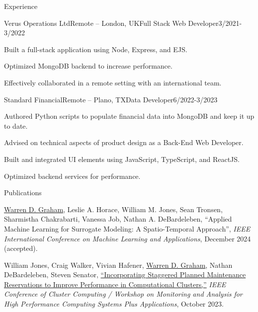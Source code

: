 \documentclass{resume} %
\begin{document}
\begin{rSection}{Experience}
\begin{rSubsection}{Verus Operations Ltd}{Remote – London, UK}{Full Stack Web Developer}{3/2021-3/2022}
  \item Built a full-stack application using Node, Express, and EJS.
  \item Optimized MongoDB backend to increase performance.
  \item Effectively collaborated in a remote setting with an international team.
\end{rSubsection}

\begin{rSubsection}{Standard Financial}{Remote – Plano, TX}{Data Developer}{6/2022-3/2023}
  \item Authored Python scripts to populate financial data into MongoDB and keep it up to date. 
  \item Advised on technical aspects of product design as a Back-End Web Developer.
  \item Built and integrated UI elements using JavaScript, TypeScript, and ReactJS.
  \item Optimized backend services for performance.
\end{rSubsection}

\end{rSection} 

\begin{rSection}{Publications} 
  \itemsep -1pt
  \renewcommand{\labelenumi}{[\theenumi]}
  \begin{etaremune}
    \item \underline{Warren D. Graham}, Leslie A. Horace, William M. Jones, Sean Tronsen, Sharmistha Chakrabarti, Vanessa Job, Nathan A. DeBardeleben, “Applied Machine Learning for Surrogate Modeling: A Spatio-Temporal Approach”, \textit{IEEE International Conference on Machine Learning and Applications}, December 2024 (accepted).
    \item William Jones, Craig Walker, Vivian Hafener, \underline{Warren D. Graham}, Nathan DeBardeleben, Steven Senator, \href{https://doi.ieeecomputersociety.org/10.1109/CLUSTERWorkshops61457.2023.00015}{“Incorporating Staggered Planned Maintenance Reservations to Improve Performance in Computational Clusters,”} \textit{IEEE Conference of Cluster Computing / Workshop on Monitoring and Analysis for High Performance Computing Systems Plus Applications}, October 2023.
  \end{etaremune}
\end{rSection}
\end{document}
